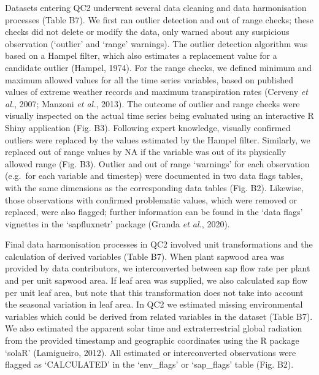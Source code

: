 \documentclass[11pt,twoside]{reedthesis}
\begin{document}
Datasets entering QC2 underwent several data cleaning and data
harmonisation processes (Table B7). We first ran outlier detection and
out of range checks; these checks did not delete or modify the data,
only warned about any suspicious observation (`outlier' and `range'
warnings). The outlier detection algorithm was based on a Hampel filter,
which also estimates a replacement value for a candidate outlier
(Hampel, 1974). For the range checks, we defined minimum and maximum
allowed values for all the time series variables, based on published
values of extreme weather records and maximum transpiration rates
(Cerveny \emph{et al.}, 2007; Manzoni \emph{et al.}, 2013). The outcome
of outlier and range checks were visually inspected on the actual time
series being evaluated using an interactive R Shiny application (Fig.
B3). Following expert knowledge, visually confirmed outliers were
replaced by the values estimated by the Hampel filter. Similarly, we
replaced out of range values by NA if the variable was out of its
physically allowed range (Fig. B3). Outlier and out of range `warnings'
for each observation (e.g.~for each variable and timestep) were
documented in two data flags tables, with the same dimensions as the
corresponding data tables (Fig. B2). Likewise, those observations with
confirmed problematic values, which were removed or replaced, were also
flagged; further information can be found in the `data flags' vignettes
in the `sapfluxnetr' package (Granda \emph{et al.}, 2020).\par

Final data harmonisation processes in QC2 involved unit transformations
and the calculation of derived variables (Table B7). When plant sapwood
area was provided by data contributors, we interconverted between sap
flow rate per plant and per unit sapwood area. If leaf area was
supplied, we also calculated sap flow per unit leaf area, but note that
this transformation does not take into account the seasonal variation in
leaf area. In QC2 we estimated missing environmental variables which
could be derived from related variables in the dataset (Table B7). We
also estimated the apparent solar time and extraterrestrial global
radiation from the provided timestamp and geographic coordinates using
the R package `solaR' (Lamigueiro, 2012). All estimated or
interconverted observations were flagged as `CALCULATED' in the
`env\_flags' or `sap\_flags' table (Fig. B2).\par

\vspace*{\fill} \newpage
\end{document}
